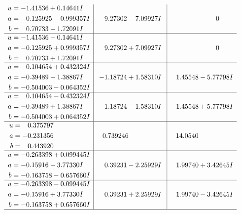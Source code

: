 \documentclass[1p]{elsarticle_modified}
\theoremstyle{definition}
\begin{document}
$$\begin{array}{c|c|c}
\begin{aligned}
u &= -1.41536 + 0.14641 I \\
a &= -0.125925 - 0.999357 I \\
b &= \phantom{-}0.70733 - 1.72091 I\end{aligned}
 & \phantom{-}9.27302 - 7.09927 I & \phantom{-0.000000 } 0 \\ \hline\begin{aligned}
u &= -1.41536 - 0.14641 I \\
a &= -0.125925 + 0.999357 I \\
b &= \phantom{-}0.70733 + 1.72091 I\end{aligned}
 & \phantom{-}9.27302 + 7.09927 I & \phantom{-0.000000 } 0 \\ \hline\begin{aligned}
u &= \phantom{-}0.104654 + 0.432324 I \\
a &= -0.39489 - 1.38867 I \\
b &= -0.504003 - 0.064352 I\end{aligned}
 & -1.18724 + 1.58310 I & \phantom{-}1.45548 - 5.77798 I \\ \hline\begin{aligned}
u &= \phantom{-}0.104654 - 0.432324 I \\
a &= -0.39489 + 1.38867 I \\
b &= -0.504003 + 0.064352 I\end{aligned}
 & -1.18724 - 1.58310 I & \phantom{-}1.45548 + 5.77798 I \\ \hline\begin{aligned}
u &= \phantom{-}0.375797\phantom{ +0.000000I} \\
a &= -0.231356\phantom{ +0.000000I} \\
b &= \phantom{-}0.443920\phantom{ +0.000000I}\end{aligned}
 & \phantom{-}0.739246\phantom{ +0.000000I} & \phantom{-}14.0540\phantom{ +0.000000I} \\ \hline\begin{aligned}
u &= -0.263398 + 0.099445 I \\
a &= -0.15916 - 3.77330 I \\
b &= -0.163758 - 0.657660 I\end{aligned}
 & \phantom{-}0.39231 - 2.25929 I & \phantom{-}1.99740 + 3.42645 I \\ \hline\begin{aligned}
u &= -0.263398 - 0.099445 I \\
a &= -0.15916 + 3.77330 I \\
b &= -0.163758 + 0.657660 I\end{aligned}
 & \phantom{-}0.39231 + 2.25929 I & \phantom{-}1.99740 - 3.42645 I\\
 \hline 
 \end{array}$$\newpage\newpage\renewcommand{\arraystretch}{1}
\end{document}
